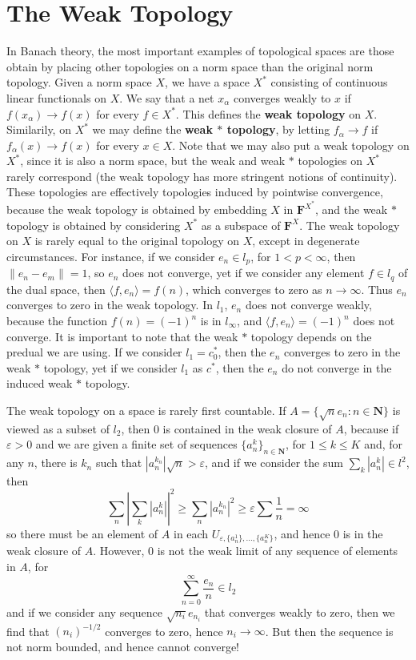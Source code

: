 \chapter{The Weak Topology}

\begin{example}
    In Banach theory, the most important examples of topological spaces are those obtain by placing other topologies on a norm space than the original norm topology. Given a norm space $X$, we have a space $X^*$ consisting of continuous linear functionals on $X$. We say that a net $x_\alpha$ converges weakly to $x$ if $f(x_\alpha) \to f(x)$ for every $f \in X^*$. This defines the {\bf weak topology} on $X$. Similarily, on $X^*$ we may define the {\bf weak $*$ topology}, by letting $f_\alpha \to f$ if $f_\alpha(x) \to f(x)$ for every $x \in X$. Note that we may also put a weak topology on $X^*$, since it is also a norm space, but the weak and weak $*$ topologies on $X^*$ rarely correspond (the weak topology has more stringent notions of continuity). These topologies are effectively topologies induced by pointwise convergence, because the weak topology is obtained by embedding $X$ in $\mathbf{F}^{X^*}$, and the weak $*$ topology is obtained by considering $X^*$ as a subspace of $\mathbf{F}^X$. The weak topology on $X$ is rarely equal to the original topology on $X$, except in degenerate circumstances. For instance, if we consider $e_n \in l_p$, for $1 < p < \infty$, then $\| e_n - e_m \| = 1$, so $e_n$ does not converge, yet if we consider any element $f \in l_q$ of the dual space, then $\langle f, e_n \rangle = f(n)$, which converges to zero as $n \to \infty$. Thus $e_n$ converges to zero in the weak topology. In $l_1$, $e_n$ does not converge weakly, because the function $f(n) = (-1)^n$ is in $l_\infty$, and $\langle f, e_n \rangle = (-1)^n$ does not converge. It is important to note that the weak $*$ topology depends on the predual we are using. If we consider $l_1 = c_0^*$, then the $e_n$ converges to zero in the weak $*$ topology, yet if we consider $l_1$ as $c^*$, then the $e_n$ do not converge in the induced weak $*$ topology.

    The weak topology on a space is rarely first countable. If $A = \{ \sqrt{n} e_n : n \in \mathbf{N} \}$ is viewed as a subset of $l_2$, then 0 is contained in the weak closure of $A$, because if $\varepsilon > 0$ and we are given a finite set of sequences $\{ a_n^k \}_{n \in \mathbf{N}}$, for $1 \leq k \leq K$ and, for any $n$, there is $k_n$ such that $|a_n^{k_n}| \sqrt{n} > \varepsilon$, and if we consider the sum $\sum_k |a_n^k| \in l^2$, then
    \[ \sum_n \left|\sum_k |a_n^k| \right|^2 \geq \sum_n |a_n^{k_n}|^2 \geq \varepsilon \sum \frac{1}{n} = \infty \]
    so there must be an element of $A$ in each $U_{\varepsilon, \{ a_n^1 \}, \dots, \{ a_n^K \}}$, and hence $0$ is in the weak closure of $A$. However, 0 is not the weak limit of any sequence of elements in $A$, for
    \[ \sum_{n = 0}^\infty \frac{e_n}{n} \in l_2 \]
    and if we consider any sequence $\sqrt{n_i} e_{n_i}$ that converges weakly to zero, then we find that $(n_i)^{-1/2}$ converges to zero, hence $n_i \to \infty$. But then the sequence is not norm bounded, and hence cannot converge!
\end{example}
